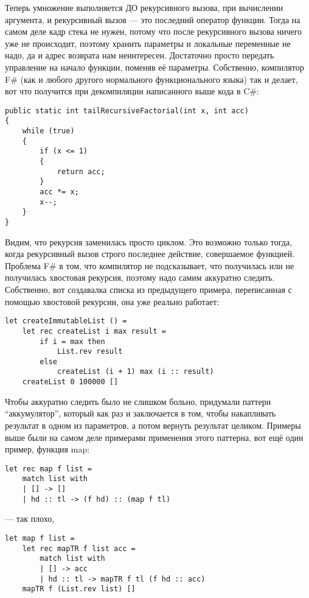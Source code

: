 \documentclass[a5paper]{article}
\begin{document}
Теперь умножение выполняется ДО рекурсивного вызова, при вычислении аргумента, и рекурсивный вызов --- это последний оператор функции. Тогда на самом деле кадр стека не нужен, потому что после рекурсивного вызова ничего уже не происходит, поэтому хранить параметры и локальные переменные не надо, да и адрес возврата нам неинтересен. Достаточно просто передать управление на начало функции, поменяв её параметры. Собственно, компилятор F\# (как и любого другого нормального функционального языка) так и делает, вот что получится при декомпиляции написанного выше кода в C\#:

\begin{verbatim}
public static int tailRecursiveFactorial(int x, int acc)
{
    while (true)
    {
        if (x <= 1)
        {
            return acc;
        }
        acc *= x;
        x--;
    }
}
\end{verbatim}

Видим, что рекурсия заменилась просто циклом. Это возможно только тогда, когда рекурсивный вызов строго последнее действие, совершаемое функцией. Проблема F\# в том, что компилятор не подсказывает, что получилась или не получилась хвостовая рекурсия, поэтому надо самим аккуратно следить. Собственно, вот создавалка списка из предыдущего примера, переписанная с помощью хвостовой рекурсии, она уже реально работает:

\begin{verbatim}
let createImmutableList () =
    let rec createList i max result =
        if i = max then
            List.rev result
        else
            createList (i + 1) max (i :: result)
    createList 0 100000 []
\end{verbatim}


Чтобы аккуратно следить было не слишком больно, придумали паттерн ``аккумулятор'', который как раз и заключается в том, чтобы накапливать результат в одном из параметров, а потом вернуть результат целиком. Примеры выше были на самом деле примерами применения этого паттерна, вот ещё один пример, функция map:

\begin{verbatim}
let rec map f list =
    match list with
    | [] -> []
    | hd :: tl -> (f hd) :: (map f tl)
\end{verbatim}

--- так плохо, 

\begin{verbatim}
let map f list =
    let rec mapTR f list acc =
        match list with
        | [] -> acc
        | hd :: tl -> mapTR f tl (f hd :: acc)
    mapTR f (List.rev list) []
\end{verbatim}
\end{document}
